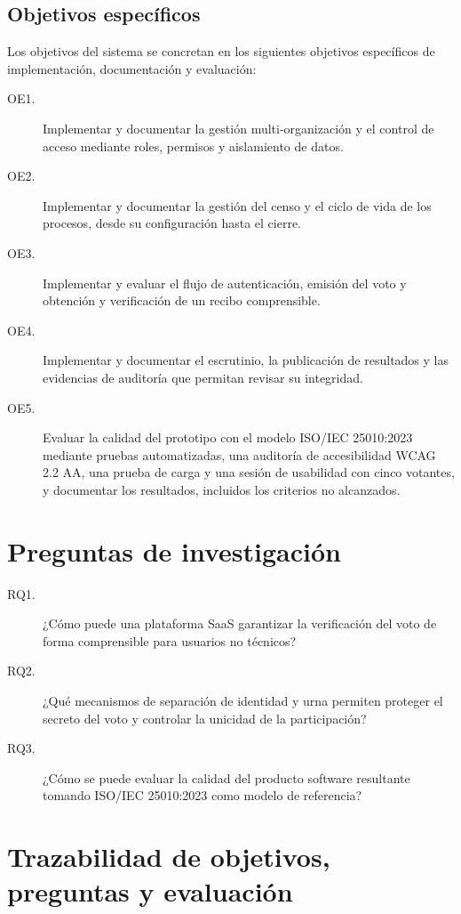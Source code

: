 \subsection{Objetivos específicos}
\label{sec:objetivos-especificos}

Los objetivos del sistema se concretan en los siguientes objetivos específicos
de implementación, documentación y evaluación:
\begin{description}
  \item[OE1.] Implementar y documentar la gestión multi-organización y el control de acceso
  mediante roles, permisos y aislamiento de datos.
  \item[OE2.] Implementar y documentar la gestión del censo y el ciclo de vida de los
  procesos, desde su configuración hasta el cierre.
  \item[OE3.] Implementar y evaluar el flujo de autenticación, emisión del voto y
  obtención y verificación de un recibo comprensible.
  \item[OE4.] Implementar y documentar el escrutinio, la publicación de resultados y las
  evidencias de auditoría que permitan revisar su integridad.
  \item[OE5.] Evaluar la calidad del prototipo con el modelo ISO/IEC 25010:2023
  mediante pruebas automatizadas, una auditoría de accesibilidad WCAG 2.2 AA,
  una prueba de carga y una sesión de usabilidad con cinco votantes, y
  documentar los resultados, incluidos los criterios no alcanzados.
\end{description}

\section{Preguntas de investigación}
\label{sec:preguntas-investigacion}

\begin{description}
  \item[RQ1.] ¿Cómo puede una plataforma SaaS garantizar la verificación del
  voto de forma comprensible para usuarios no técnicos?
  \item[RQ2.] ¿Qué mecanismos de separación de identidad y urna permiten
  proteger el secreto del voto y controlar la unicidad de la participación?
  \item[RQ3.] ¿Cómo se puede evaluar la calidad del producto software
  resultante tomando ISO/IEC 25010:2023 como modelo de referencia?
\end{description}

\section{Trazabilidad de objetivos, preguntas y evaluación}
\label{sec:trazabilidad-investigacion}

